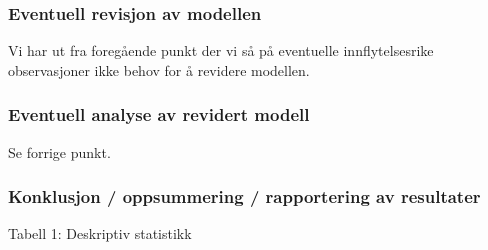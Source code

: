 \documentclass[
]{article}
\newenvironment{Shaded}{\begin{snugshade}}{\end{snugshade}}
\newcommand{\AttributeTok}[1]{\textcolor[rgb]{0.77,0.63,0.00}{#1}}
\newcommand{\CommentTok}[1]{\textcolor[rgb]{0.56,0.35,0.01}{\textit{#1}}}
\newcommand{\FunctionTok}[1]{\textcolor[rgb]{0.00,0.00,0.00}{#1}}
\newcommand{\NormalTok}[1]{#1}
\newcommand{\OtherTok}[1]{\textcolor[rgb]{0.56,0.35,0.01}{#1}}
\newcommand{\SpecialCharTok}[1]{\textcolor[rgb]{0.00,0.00,0.00}{#1}}
\newcommand{\StringTok}[1]{\textcolor[rgb]{0.31,0.60,0.02}{#1}}
\begin{document}
\hypertarget{eventuell-revisjon-av-modellen-1}{%
\subsubsection{Eventuell revisjon av modellen}\label{eventuell-revisjon-av-modellen-1}}

Vi har ut fra foregående punkt der vi så på eventuelle innflytelsesrike observasjoner ikke behov for å revidere modellen.

\hypertarget{eventuell-analyse-av-revidert-modell-1}{%
\subsubsection{Eventuell analyse av revidert modell}\label{eventuell-analyse-av-revidert-modell-1}}

Se forrige punkt.

\hypertarget{konklusjon-oppsummering-rapportering-av-resultater-1}{%
\subsubsection{Konklusjon / oppsummering / rapportering av resultater}\label{konklusjon-oppsummering-rapportering-av-resultater-1}}

Tabell 1: Deskriptiv statistikk

\begin{Shaded}
\end{Shaded}
\end{document}
